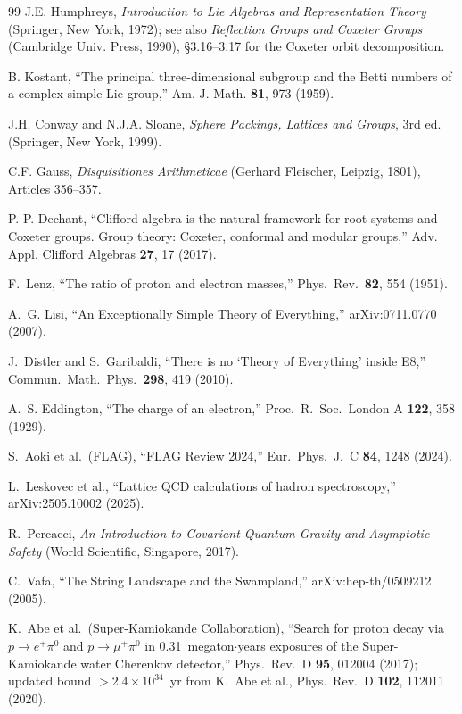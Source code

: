 \documentclass[aps,prd,twocolumn,superscriptaddress,floatfix,nofootinbib]{revtex4-2}
\theoremstyle{definition}
\theoremstyle{remark}
\begin{document}
\begin{thebibliography}{99}
 J.E. Humphreys, \textit{Introduction to Lie Algebras and Representation Theory} (Springer, New York, 1972); see also \textit{Reflection Groups and Coxeter Groups} (Cambridge Univ. Press, 1990), \S3.16--3.17 for the Coxeter orbit decomposition.

 B. Kostant, ``The principal three-dimensional subgroup and the Betti numbers of a complex simple Lie group,'' Am. J. Math. \textbf{81}, 973 (1959).

 J.H. Conway and N.J.A. Sloane, \textit{Sphere Packings, Lattices and Groups}, 3rd ed. (Springer, New York, 1999).

 C.F. Gauss, \textit{Disquisitiones Arithmeticae} (Gerhard Fleischer, Leipzig, 1801), Articles 356--357.

 P.-P. Dechant, ``Clifford algebra is the natural framework for root systems and Coxeter groups. Group theory: Coxeter, conformal and modular groups,'' Adv. Appl. Clifford Algebras \textbf{27}, 17 (2017).

 F.~Lenz, ``The ratio of proton and electron masses,'' Phys.\ Rev.\ \textbf{82}, 554 (1951).

 A.~G. Lisi, ``An Exceptionally Simple Theory of Everything,''
arXiv:0711.0770 (2007).

 J.~Distler and S.~Garibaldi, ``There is no `Theory of
Everything' inside E8,'' Commun.\ Math.\ Phys.\ \textbf{298}, 419 (2010).

 A.~S. Eddington, ``The charge of an electron,''
Proc.\ R.\ Soc.\ London A \textbf{122}, 358 (1929).

 S.~Aoki et al.\ (FLAG), ``FLAG Review 2024,''
Eur.\ Phys.\ J.\ C \textbf{84}, 1248 (2024).

 L.~Leskovec et al., ``Lattice QCD calculations of hadron
spectroscopy,'' arXiv:2505.10002 (2025).

 R.~Percacci, \textit{An Introduction to Covariant Quantum
Gravity and Asymptotic Safety} (World Scientific, Singapore, 2017).

 C.~Vafa, ``The String Landscape and the Swampland,''
arXiv:hep-th/0509212 (2005).

 K.~Abe et al.\ (Super-Kamiokande Collaboration), ``Search for
proton decay via $p \to e^+\pi^0$ and $p \to \mu^+\pi^0$ in 0.31~megaton$\cdot$years
exposures of the Super-Kamiokande water Cherenkov detector,''
Phys.\ Rev.\ D \textbf{95}, 012004 (2017); updated bound $> 2.4 \times 10^{34}$~yr
from K.~Abe et al., Phys.\ Rev.\ D \textbf{102}, 112011 (2020).


\end{thebibliography}
\end{document}
